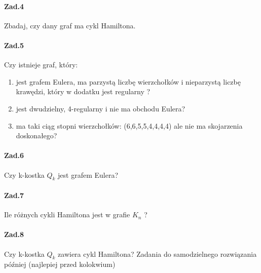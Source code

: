 \documentclass[a4paper,12pt]{article}
\theoremstyle{definition}%
\theoremstyle{definition}
\theoremstyle{problem}
\begin{document}
\paragraph{Zad.4} Zbadaj, czy dany graf ma cykl Hamiltona.

\paragraph{Zad.5} Czy istnieje graf, który:
\begin{enumerate}[label=\alph*)]
\item jest grafem Eulera, ma parzystą liczbę wierzchołków i nieparzystą liczbę krawędzi, który w dodatku jest regularny ?
\item jest dwudzielny, 4-regularny i nie ma obchodu Eulera?
\item ma taki ciąg stopni wierzchołków: (6,6,5,5,4,4,4,4) ale nie ma skojarzenia doskonałego?
\end{enumerate}

\paragraph{Zad.6} Czy k-kostka $Q_k$ jest grafem Eulera?

\paragraph{Zad.7} Ile różnych cykli Hamiltona jest w grafie $K_n$ ?

\paragraph{Zad.8} Czy k-kostka $Q_k$ zawiera cykl Hamiltona? Zadania do samodzielnego rozwiązania później (najlepiej przed kolokwium)


\end{document}
